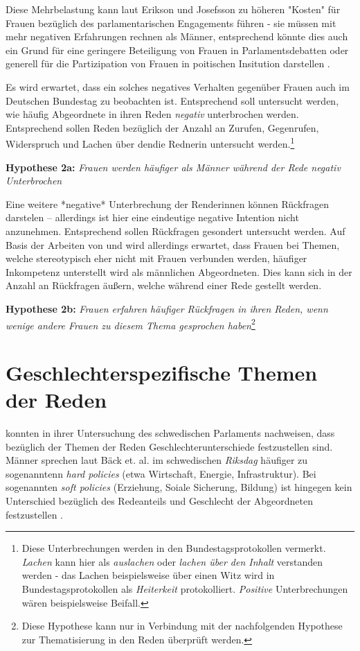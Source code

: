 \documentclass[12pt, 
    twoside=false, 
    bibliography=totoc, 
    numbers=endperiod, 
    headings=normal, 
    toc=chapterentrydotfill
    ]{scrbook}
\begin{document}
Diese Mehrbelastung kann laut Erikson und Josefsson zu höheren "Kosten" für Frauen bezüglich des parlamentarischen Engagements führen - sie müssen mit mehr negativen Erfahrungen rechnen als Männer, entsprechend könnte dies auch ein Grund für eine geringere Beteiligung von Frauen in Parlamentsdebatten oder generell für die Partizipation von Frauen in poitischen Insitution darstellen \parencites[vgl.][]{erikson_2018}[vgl.][]{back_2014}.

Es wird erwartet, dass ein solches negatives Verhalten gegenüber Frauen auch im Deutschen Bundestag zu beobachten ist. Entsprechend soll untersucht werden, wie häufig Abgeordnete in ihren Reden \emph{negativ} unterbrochen werden. Entsprechend sollen Reden bezüglich der Anzahl an Zurufen, Gegenrufen, Widerspruch und Lachen über den\*die Redner\*in untersucht werden.\footnote{Diese Unterbrechungen werden in den Bundestagsprotokollen vermerkt. \emph{Lachen} kann hier als \emph{auslachen} oder \emph{lachen über den Inhalt} verstanden werden - das Lachen beispielsweise über einen Witz wird in Bundestagsprotokollen als \emph{Heiterkeit} protokolliert. \emph{Positive} Unterbrechungen wären beispielsweise Beifall.}

\textbf{Hypothese 2a:} \emph{Frauen werden häufiger als Männer während der Rede negativ Unterbrochen}

Eine weitere *negative* Unterbrechung der Render\*innen können Rückfragen darstelen -- allerdings ist hier eine eindeutige negative Intention nicht anzunehmen. Entsprechend sollen Rückfragen gesondert untersucht werden. Auf Basis der Arbeiten von \textcite{brescoll_2011} und \textcite{eagly_2002}  wird allerdings erwartet, dass Frauen bei Themen, welche stereotypisch eher nicht mit Frauen verbunden werden, häufiger Inkompetenz unterstellt wird als männlichen Abgeordneten. Dies kann sich in der Anzahl an Rückfragen äußern, welche während einer Rede gestellt werden. 

\textbf{Hypothese 2b:} \emph{Frauen erfahren häufiger Rückfragen in ihren Reden, wenn wenige andere Frauen zu diesem Thema gesprochen haben}\footnote{Diese Hypothese kann nur in Verbindung mit der nachfolgenden Hypothese zur Thematisierung in den Reden überprüft werden.}

\section{Geschlechterspezifische Themen der Reden}

\textcite{back_2014} konnten in ihrer Untersuchung des schwedischen Parlaments nachweisen, dass bezüglich der Themen der Reden Geschlechterunterschiede festzustellen sind. Männer sprechen laut Bäck et. al. im schwedischen \emph{Riksdag} häufiger zu sogenanntenn \emph{hard policies} (etwa Wirtschaft, Energie, Infrastruktur). Bei sogenannten \emph{soft policies} (Erziehung, Soiale Sicherung, Bildung) ist hingegen kein Unterschied bezüglich des Redeanteils und Geschlecht der Abgeordneten festzustellen \parencite[514f.]{back_2014}.
\end{document}
